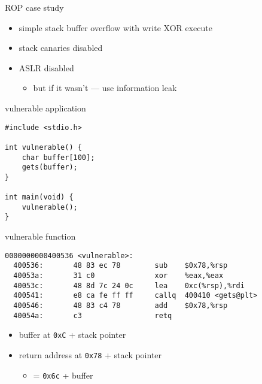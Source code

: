 \usetikzlibrary{arrows.meta,shapes.multipart}

\begin{frame}{ROP case study}
    \begin{itemize}
    \item simple stack buffer overflow with write XOR execute
    \item stack canaries disabled
    \item ASLR disabled
        \begin{itemize}
        \item but if it wasn't --- use information leak
        \end{itemize}
    \end{itemize}
\end{frame}

\begin{frame}[fragile,label=vuln]{vulnerable application}
    \lstset{language=C,style=small}
\begin{lstlisting}
#include <stdio.h>

int vulnerable() {
    char buffer[100];
    gets(buffer);
}

int main(void) {
    vulnerable();
}
\end{lstlisting}
\end{frame}

\begin{frame}[fragile,label=vulnFunc]{vulnerable function}
    \lstset{language=myasm,style=small}
\begin{lstlisting}
0000000000400536 <vulnerable>:
  400536:       48 83 ec 78        sub    $0x78,%rsp
  40053a:       31 c0              xor    %eax,%eax
  40053c:       48 8d 7c 24 0c     lea    0xc(%rsp),%rdi
  400541:       e8 ca fe ff ff     callq  400410 <gets@plt>
  400546:       48 83 c4 78        add    $0x78,%rsp
  40054a:       c3                 retq   
\end{lstlisting}
    \begin{itemize}
        \item<2> buffer at \texttt{0xC} + stack pointer
        \item<2> return address at \texttt{0x78} + stack pointer
            \begin{itemize}
                \item = \texttt{0x6c} + buffer
            \end{itemize}
    \end{itemize}
\end{frame}

